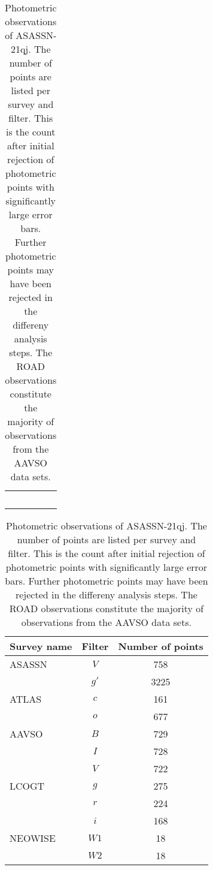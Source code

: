 \documentclass[sn-nature]{sn-jnl}%
\begin{document}
\begin{table}
    \centering
    \caption{Photometric observations of ASASSN-21qj. The number of points are listed per survey and filter. %
    This is the count after initial rejection of photometric points with significantly large error bars.
    Further photometric points may have been rejected in the differeny analysis steps.
    The ROAD observations constitute the majority of observations from the AAVSO data sets.}
    \begin{tabular}{p{}}
    \, \\
    \end{tabular}
   \begin{tabular}{@{}lcc@{}}
   \hline\hline
Survey name  & Filter & Number of points                    \\
       \hline
ASASSN   &  $V$   & 758 \\
  &  $g'$   & 3225 \\
       \hline
ATLAS & $c$ & 161 \\
& $o$ & 677 \\
       \hline
AAVSO   &  $B$   & 729 \\    %
  &  $I$   & 728 \\    %
  &  $V$   & 722 \\    %
       \hline
LCOGT   &  $g$   & 275 \\    %
  &  $r$   & 224 \\    %
  &  $i$   & 168 \\    %
       \hline
NEOWISE & $W1$ & 18 \\
& $W2$ & 18 \\
       \hline
   \end{tabular}

\label{tab:photometry}
\end{table}

\end{document}
